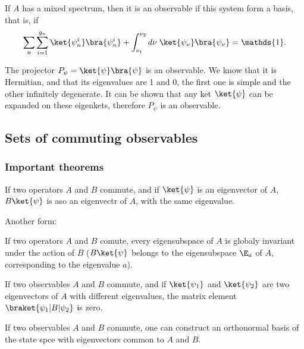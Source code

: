 If $A$ has a mixed spectrum, then it is an observable if this system form a basis, that is, if
\begin{align}
    \sum_{n}\sum_{i=1}^{g_n}\ket{\psi_n^i}\bra{\psi_n^i}+\int_{\nu_1}^{\nu_2}d\nu\;\ket{\psi_\nu}\bra{\psi_\nu}=\mathds{1}.
\end{align}

\begin{emphasizer}
    The projector $P_\psi=\ket{\psi}\bra{\psi}$ is an observable. We know that it is Hermitian, and that its eigenvalues are 1 and 0, the first one is simple and the other 
    infinitely degenerate. It can be shown that any ket $\ket{\psi}$ can be expanded on these eigenkets, therefore $P_\psi$ is an observable.
\end{emphasizer}
\subsection{Sets of commuting observables}

\subsubsection{Important theorems}
\begin{definition}[Theorem I]
    If two operators $A$ and $B$ commute, and if $\ket{\psi}$ is an eigenvector of $A$, $B\ket{\psi}$ is aso an eigenvectr of $A$, with the same eigenvalue.

    Another form:

    If two operators $A$ and $B$ comute, every eigensubspace of $A$ is globaly invariant under the action of $B$ ($B\ket{\psi}$ belongs to the eigensubspace $\E_a$ of $A$, corresponding to the 
    eigenvalue $a$).
\end{definition} 

\begin{definition}
    If two observables $A$ and $B$ commute, and if $\ket{\psi_1}$ and $\ket{\psi_2}$ are two eigenvectors of $A$ with different eigenvalues, the matrix element 
    $\braket{\psi_1|B|\psi_2}$ is zero. 
\end{definition}

\begin{definition}
    If two observables $A$ and $B$ commute, one can construct an orthonormal basis of the state spce with eigenvectors common to $A$ and $B$.
\end{definition}

